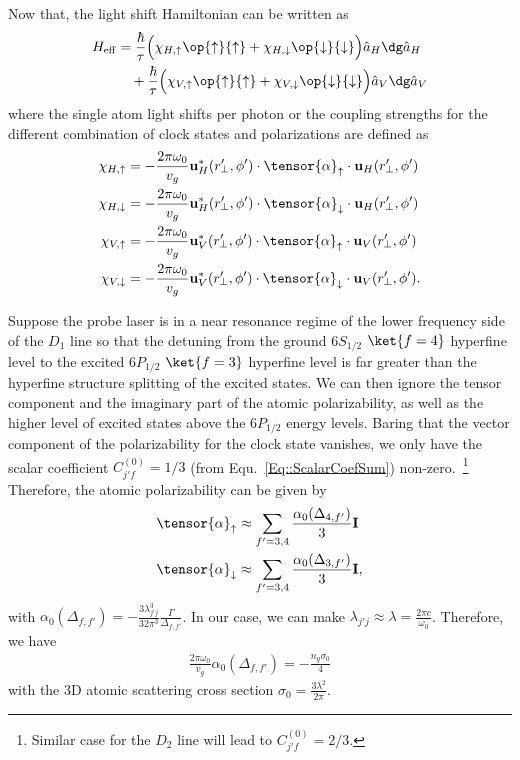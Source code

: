 \documentclass[]{report}
\begin{document}
Now that, the light shift Hamiltonian can be written as 
\begin{align}
H_{\rm eff} & = \frac{ \hbar }{ \tau}\Big( \chi_{H,\uparrow}\op{\uparrow}{\uparrow} +  \chi_{H,\downarrow} \op{\downarrow}{\downarrow} \Big) \hat{a}_H\dg \hat{a}_H \nonumber\\
&\quad +  \frac{ \hbar }{ \tau} \Big( \chi_{V,\uparrow}\op{\uparrow}{\uparrow} +  \chi_{V,\downarrow} \op{\downarrow}{\downarrow} \Big) \hat{a}_V\dg \hat{a}_V  \label{HeffLS}
\end{align}
where the single atom light shifts per photon or the coupling strengths for the different combination of clock states and polarizations are defined as
\begin{align}
\chi_{H,\uparrow} &=  -\frac{2\pi\omega_0}{v_g} \mathbf{u}^*_{H}(r^\prime\!\!_\perp,\phi') \cdot\tensor{\alpha}_{\uparrow}\cdot \mathbf{u}_{H}(r^\prime\!\!_\perp,\phi') \\
\chi_{H,\downarrow} &=  -\frac{2\pi\omega_0}{v_g} \mathbf{u}^*_{H}(r^\prime\!\!_\perp,\phi') \cdot\tensor{\alpha}_{\downarrow}\cdot \mathbf{u}_{H}(r^\prime\!\!_\perp,\phi') \\
\chi_{V,\uparrow} &=  -\frac{2\pi\omega_0}{v_g}  \mathbf{u}^*_{V}(r^\prime\!\!_\perp,\phi') \cdot\tensor{\alpha}_{\uparrow}\cdot \mathbf{u}_{V}(r^\prime\!\!_\perp,\phi')  \\
\chi_{V,\downarrow} &=  -\frac{2\pi\omega_0}{v_g}  \mathbf{u}^*_{V}(r^\prime\!\!_\perp,\phi') \cdot\tensor{\alpha}_{\downarrow}\cdot \mathbf{u}_{V}(r^\prime\!\!_\perp,\phi'). 
\end{align}

Suppose the probe laser is in a near resonance regime of the lower frequency side of the $ D_1 $ line so that the detuning from the ground $ 6S_{1/2} $ $ \ket{f=4} $ hyperfine level to the excited $ 6P_{1/2} $ $ \ket{f=3} $ hyperfine level is far greater than the hyperfine structure splitting of the excited states. We can then ignore the tensor component and the imaginary part of the atomic polarizability, as well as the higher level of excited states above the $ 6P_{1/2} $ energy levels. Baring that the vector component of the polarizability for the clock state vanishes, we only have the scalar coefficient $C_{j' f}^{(0)} =1/3  $ (from Equ.~\eqref{Eq::ScalarCoefSum}) non-zero.~\footnote{Similar case for the $ D_2 $ line will lead to $ C_{j' f}^{(0)} =2/3 $.} Therefore, the atomic polarizability can be given by
\begin{align}
\tensor{\alpha}_{\uparrow} &\approx\sum_{f'=3,4}\frac{\alpha_0(\Delta_{4,f'})}{3}\mathbf{I} \\
\tensor{\alpha}_{\downarrow} &\approx\sum_{f'=3,4}\frac{\alpha_0(\Delta_{3,f'})}{3}\mathbf{I},
\end{align}
with $ \alpha_0(\Delta_{f,f'})=-\frac{3\lambda_{j'j}^3}{32\pi^3} \frac{\Gamma}{\Delta_{f,f'}} $. In our case, we can make $ \lambda_{j'j}\approx\lambda= \frac{2\pi c}{\omega_0}$. Therefore, we have
\begin{align}
\frac{2\pi\omega_0}{v_g}\alpha_0(\Delta_{f,f'})=-\frac{n_g\sigma_0}{4}
\end{align}
with the 3D atomic scattering cross section $ \sigma_0= \frac{3\lambda^2}{2\pi}  $. 
\end{document}
